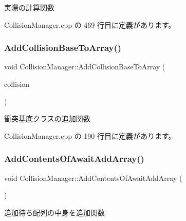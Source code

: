 実際の計算関数 



 Collision\+Manager.\+cpp の 469 行目に定義があります。

\mbox{\label{class_collision_manager_a42be7a26321110f5daaf1828da32f667}} 
\subsubsection{\texorpdfstring{Add\+Collision\+Base\+To\+Array()}{AddCollisionBaseToArray()}}
{\footnotesize\ttfamily void Collision\+Manager\+::\+Add\+Collision\+Base\+To\+Array (\begin{DoxyParamCaption}\item[{\mbox{\hyperlink{class_collision_base}{Collision\+Base}} $\ast$}]{collision }\end{DoxyParamCaption})}



衝突基底クラスの追加関数 



 Collision\+Manager.\+cpp の 190 行目に定義があります。

\mbox{\label{class_collision_manager_a53e468bb8624f84a5c65c9779781033f}} 
\subsubsection{\texorpdfstring{Add\+Contents\+Of\+Await\+Add\+Array()}{AddContentsOfAwaitAddArray()}}
{\footnotesize\ttfamily void Collision\+Manager\+::\+Add\+Contents\+Of\+Await\+Add\+Array (\begin{DoxyParamCaption}{ }\end{DoxyParamCaption})\hspace{0.3cm}{\ttfamily [private]}}



追加待ち配列の中身を追加関数 



